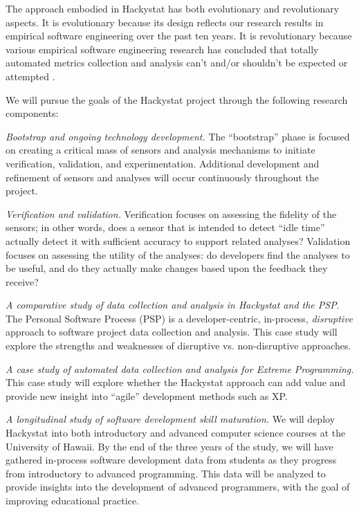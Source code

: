 The approach embodied in Hackystat has both evolutionary and revolutionary
aspects. It is evolutionary because its design reflects
our research results in empirical software engineering over the past
ten years.  It is revolutionary because various empirical software
engineering research has concluded that totally automated metrics collection
and analysis can't and/or shouldn't be expected or attempted
\cite{Humphrey95,Fuggetta98,Zelkowitz99}.

We will pursue the goals of the Hackystat project through the following
research components:

\begin{smallenum2}
  
\item 
{\em  Bootstrap and ongoing technology development.}  The
  ``bootstrap'' phase is focused on creating a critical mass of sensors
  and analysis mechanisms to initiate verification, validation, and
  experimentation.  Additional development and refinement of sensors and
  analyses will occur continuously throughout the project.
  
\item 
{\em Verification and validation.}  Verification focuses on assessing
the fidelity of the sensors; in other words, does a sensor that is intended 
to detect ``idle time'' actually detect it with sufficient accuracy to
support related analyses? Validation focuses on assessing the utility of
the analyses: do developers find the analyses to be useful, and do they
actually make changes based upon the feedback they receive?
  
\item 
{\em A comparative study of data collection and analysis in Hackystat
and the PSP}.  The Personal Software Process (PSP) is
a developer-centric, in-process, {\em disruptive} approach to software 
project data collection and analysis.  This case study will explore the 
strengths and weaknesses of disruptive vs. non-disruptive approaches. 

\item 
{\em A case study of automated data collection and analysis for
Extreme Programming.} This case study will explore whether the Hackystat
approach can add value and provide new insight into ``agile''
development methods such as XP.

\item 
{\em A longitudinal study of software development skill maturation.}
  We will deploy Hackystat into both introductory and advanced computer
  science courses at the University of Hawaii.  By the end of the three
  years of the study, we will have gathered in-process software development
  data from students as they progress from introductory to advanced
  programming. This data will be analyzed to provide insights into the 
  development of advanced programmers, with the goal of improving
  educational practice.

\end{smallenum2}  

